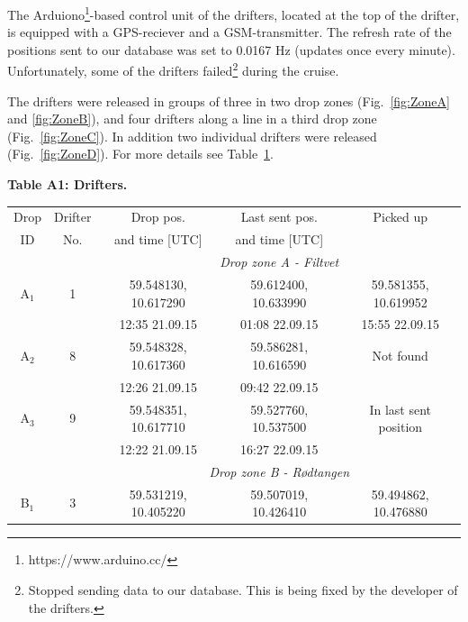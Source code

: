 \documentclass[12pt,a4paper,english]{article}
\begin{document}
The Arduiono\footnote{https://www.arduino.cc/}-based control unit of the drifters, located at the top of the drifter, is equipped with a GPS-reciever and a GSM-transmitter. The refresh rate of the positions sent to our database was set to 0.0167 Hz (updates once every minute). Unfortunately, some of the drifters failed\footnote{Stopped sending data to our database. This is being fixed by the developer of the drifters.} during the cruise.

The drifters were released in groups of three in two drop zones (Fig.~\ref{fig:ZoneA} and \ref{fig:ZoneB}), and four drifters along a line in a third drop zone (Fig.~\ref{fig:ZoneC}). In addition two individual drifters were released (Fig.~\ref{fig:ZoneD}). For more details see Table~\ref{tab:Drifters}.


\begin{table}[tb]
{\bf Table A1: Drifters.}\\
\label{tab:Drifters}
\begin{tabular}{|c|c|ccc|} 
        \hline
        Drop & Drifter & Drop pos.            & Last sent pos.          & Picked up                  \\
        ID  & No.     & and time [UTC]       & and time [UTC]          &                            \\ \hline
             &         &          \multicolumn{3}{c|}{\textit{Drop zone A - Filtvet}}                 \\ 
        A$_1$& 1       & 59.548130, 10.617290 & 59.612400, 10.633990    & 59.581355, 10.619952       \\
             &         & 12:35 21.09.15       & 01:08 22.09.15          & 15:55 22.09.15             \\ 
        A$_2$& 8       & 59.548328, 10.617360 & 59.586281, 10.616590    & Not found                  \\
             &         & 12:26 21.09.15       & 09:42 22.09.15          &                            \\
        A$_3$& 9       & 59.548351, 10.617710 & 59.527760, 10.537500    & In last sent position      \\
             &         & 12:22 21.09.15       & 16:27 22.09.15          &                            \\ \hline 
             &         &          \multicolumn{3}{c|}{\textit{Drop zone B - R\o dtangen}}             \\
        B$_1$& 3       & 59.531219, 10.405220 & 59.507019, 10.426410    & 59.494862, 10.476880       \\

\end{tabular}
\end{table}
\end{document}
